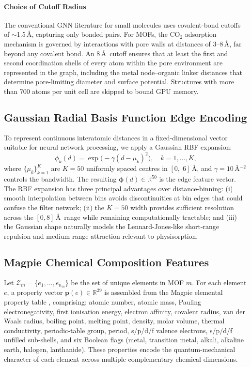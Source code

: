 \documentclass[conference]{IEEEtran}
\begin{document}
\paragraph{Choice of Cutoff Radius}
The conventional GNN literature for small molecules uses covalent-bond
cutoffs of $\sim$1.5\,\AA, capturing only bonded pairs.  For MOFs, the
CO$_2$ adsorption mechanism is governed by interactions with pore walls at
distances of 3--8\,\AA, far beyond any covalent bond.  An 8\,\AA\ cutoff
ensures that at least the first and second coordination shells of every
atom within the pore environment are represented in the graph, including
the metal node–organic linker distances that determine pore-limiting
diameter and surface potential.  Structures with more than 700 atoms per
unit cell are skipped to bound GPU memory.

\subsection{Gaussian Radial Basis Function Edge Encoding}
\label{sec:rbf}

To represent continuous interatomic distances in a fixed-dimensional vector
suitable for neural network processing, we apply a Gaussian RBF expansion:
\begin{equation}
  \phi_k(d) = \exp\!\bigl(-\gamma(d - \mu_k)^2\bigr),
  \quad k=1,\ldots,K,
  \label{eq:rbf}
\end{equation}
where $\{\mu_k\}_{k=1}^{K}$ are $K=50$ uniformly spaced centres in
$[0,\;6]$\,\AA, and $\gamma=10$\,\AA$^{-2}$ controls the bandwidth.
The resulting $\boldsymbol{\phi}(d)\in\mathbb{R}^{50}$ is the edge feature
vector.  The RBF expansion has three principal advantages over
distance-binning: (i) smooth interpolation between bins avoids
discontinuities at bin edges that could confuse the filter network;
(ii) the $K=50$ width provides sufficient resolution across the $[0,8]$\,\AA\
range while remaining computationally tractable; and (iii) the Gaussian
shape naturally models the Lennard-Jones-like short-range repulsion and
medium-range attraction relevant to physisorption.

\subsection{Magpie Chemical Composition Features}
\label{sec:magpie}

Let $\mathcal{Z}_m = \{e_1,\ldots,e_{n_m}\}$ be the set of unique elements
in MOF $m$.  For each element $e$, a property vector
$\mathbf{p}(e)\in\mathbb{R}^{29}$ is assembled from the Magpie elemental
property table \cite{cgcnn2018}, comprising: atomic number, atomic mass,
Pauling electronegativity, first ionisation energy, electron affinity,
covalent radius, van der Waals radius, boiling point, melting point,
density, molar volume, thermal conductivity, periodic-table group, period,
s/p/d/f valence electrons, s/p/d/f unfilled sub-shells, and six Boolean
flags (metal, transition metal, alkali, alkaline earth, halogen, lanthanide).
These properties encode the quantum-mechanical character of each element
across multiple complementary chemical dimensions.
\end{document}
